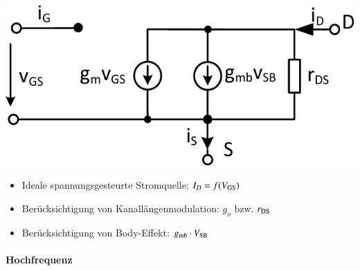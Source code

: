 \begin{minipage}[t]{0.48\columnwidth}
    \includegraphics[width=\columnwidth, align=t]{images/02_MOSFET_Pi_Ersatzschaltung_angepasste_Stromrichtung.pdf}
\end{minipage}
\hfill
\begin{minipage}[t]{0.48\columnwidth}
    \raggedright
    \begin{itemize}
        \item Ideale spannungsgesteurte Stromquelle: $I_D = f(V_{\rm GS})$
        \item Berücksichtigung von Kanallängenmodulation: $g_o$ bzw. $r_{\rm DS}$
        \item Berücksichtigung von Body-Effekt: $g_{\rm mb} \cdot V_{\rm SB}$
    \end{itemize}
\end{minipage}


\paragraph{Hochfrequenz}
\label{Hochfrequenz}

